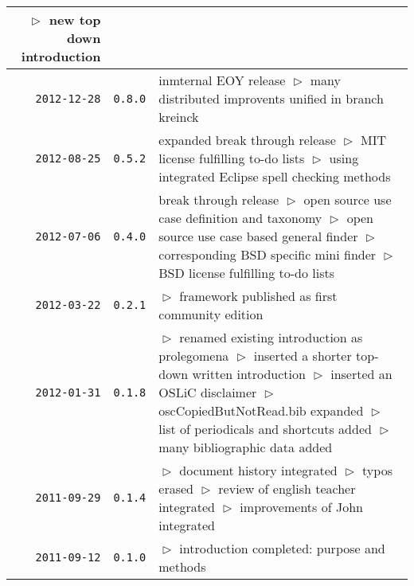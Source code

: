 \begin{table}
\begin{center}
\begin{tabular}{|r|c|p{10cm}|}
    $\vartriangleright$ new top down introduction\\
\hline
    \texttt{2012-12-28}
  & \texttt{0.8.0} 
  & inmternal EOY release\newline
    $\vartriangleright$ many distributed improvents unified in branch kreinck\\
\hline
    \texttt{2012-08-25}
  & \texttt{0.5.2} 
  & expanded break through release\newline
    $\vartriangleright$ MIT license fulfilling to-do lists\newline
    $\vartriangleright$ using integrated Eclipse spell checking methods\\
\hline
    \texttt{2012-07-06}
  & \texttt{0.4.0} 
  & break through release\newline
    $\vartriangleright$ open source use case definition and taxonomy\newline 
    $\vartriangleright$ open source use case based general finder\newline 
    $\vartriangleright$ corresponding BSD specific mini finder\newline 
    $\vartriangleright$ BSD license fulfilling to-do lists\\
\hline
    \texttt{2012-03-22}
  & \texttt{0.2.1} 
  & $\vartriangleright$ framework published as first community edition\\
\hline
    \texttt{2012-01-31}
  & \texttt{0.1.8} 
  & $\vartriangleright$ renamed existing introduction as prolegomena\newline
    $\vartriangleright$ inserted a shorter top-down written introduction\newline
    $\vartriangleright$ inserted an OSLiC disclaimer\newline
    $\vartriangleright$ oscCopiedButNotRead.bib expanded\newline 
    $\vartriangleright$ list of periodicals and shortcuts added\newline
    $\vartriangleright$ many bibliographic data added\\
\hline
    \texttt{2011-09-29}
  & \texttt{0.1.4} 
  & $\vartriangleright$ document history integrated\newline
    $\vartriangleright$ typos erased\newline
    $\vartriangleright$ review of english teacher integrated\newline
    $\vartriangleright$ improvements of John integrated\\
\hline
    \texttt{2011-09-12}
  & \texttt{0.1.0} 
  & $\vartriangleright$ introduction completed: purpose and methods \\
\hline
\hline 
\end{tabular}
\end{center}
\end{table}



%
